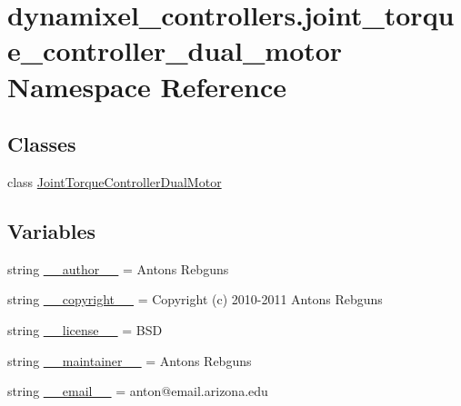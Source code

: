 \hypertarget{namespacedynamixel__controllers_1_1joint__torque__controller__dual__motor}{}\section{dynamixel\+\_\+controllers.\+joint\+\_\+torque\+\_\+controller\+\_\+dual\+\_\+motor Namespace Reference}
\label{namespacedynamixel__controllers_1_1joint__torque__controller__dual__motor}
\subsection*{Classes}
\begin{DoxyCompactItemize}
\item 
class \hyperlink{classdynamixel__controllers_1_1joint__torque__controller__dual__motor_1_1_joint_torque_controller_dual_motor}{Joint\+Torque\+Controller\+Dual\+Motor}
\end{DoxyCompactItemize}
\subsection*{Variables}
\begin{DoxyCompactItemize}
\item 
string \hyperlink{namespacedynamixel__controllers_1_1joint__torque__controller__dual__motor_a1613698cdde94a83143aec431a0fe18c}{\+\_\+\+\_\+author\+\_\+\+\_\+} = \textquotesingle{}Antons Rebguns\textquotesingle{}
\item 
string \hyperlink{namespacedynamixel__controllers_1_1joint__torque__controller__dual__motor_a94fafc3ef4aa19ec15a1f5062eac12cb}{\+\_\+\+\_\+copyright\+\_\+\+\_\+} = \textquotesingle{}Copyright (c) 2010-\/2011 Antons Rebguns\textquotesingle{}
\item 
string \hyperlink{namespacedynamixel__controllers_1_1joint__torque__controller__dual__motor_aa6e937cf46ebee52d47b55faa58205b3}{\+\_\+\+\_\+license\+\_\+\+\_\+} = \textquotesingle{}B\+SD\textquotesingle{}
\item 
string \hyperlink{namespacedynamixel__controllers_1_1joint__torque__controller__dual__motor_a66ec3417a2d4f2763c2372a9aabc32c3}{\+\_\+\+\_\+maintainer\+\_\+\+\_\+} = \textquotesingle{}Antons Rebguns\textquotesingle{}
\item 
string \hyperlink{namespacedynamixel__controllers_1_1joint__torque__controller__dual__motor_a02eb2e12a5a1680cd9367af7a256a331}{\+\_\+\+\_\+email\+\_\+\+\_\+} = \textquotesingle{}anton@email.\+arizona.\+edu\textquotesingle{}
\end{DoxyCompactItemize}


